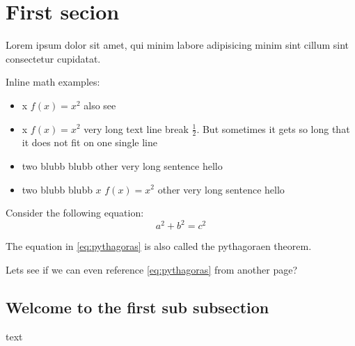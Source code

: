 \section{First secion}
Lorem ipsum dolor sit amet, qui minim labore adipisicing minim sint cillum sint consectetur
cupidatat.

Inline math examples:
\begin{itemize}
  \item x \(f(x) = x^2\) also see

  \item x $f(x) = x^2$ very long text line break $\frac{1}{2}$. But sometimes it gets so long that it does
        not fit on one single line

  \item two blubb blubb other very long sentence hello

  \item two blubb blubb $x$ \(f(x) = x^2\) other very long sentence hello
\end{itemize}

Consider the following equation:
\[
  a^2 + b^2 = c^2
  \label{eq:pythagoras}
\]

The equation in \ref{eq:pythagoras} is also called the pythagoraen theorem. \pagebreak

\pagebreak
Lets see if we can even reference \ref{eq:pythagoras} from another page?

\subsection{Welcome to the first sub subsection}
text
